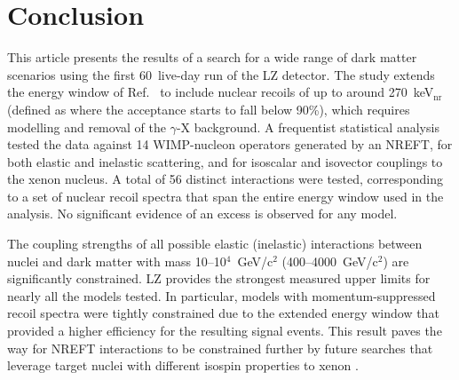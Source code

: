\documentclass[reprint, showpacs,
preprintnumbers,
amsmath,amssymb,
aps, floatfix,
superscriptaddress,
prd, nofootinbib]{revtex4-1}
\begin{document}
\section{\label{sec:conclusion}Conclusion}
This article presents the results of a search for a wide range of dark matter scenarios using the first 60~live-day run of the LZ detector.
The study extends the energy window of Ref.~\cite{LZ:SR1WS_2022} to include nuclear recoils of up to around 270~keV$_\text{nr}$ (defined as where the acceptance starts to fall below 90\%), which requires modelling and removal of the $\gamma$-X background.
A frequentist statistical analysis tested the data against 14 WIMP-nucleon operators generated by an NREFT, for both elastic and inelastic scattering, and for isoscalar and isovector couplings to the xenon nucleus.
A total of 56 distinct interactions were tested, corresponding to a set of nuclear recoil spectra that span the entire energy window used in the analysis.
No significant evidence of an excess is observed for any model.

The coupling strengths of all possible elastic (inelastic) interactions between nuclei and dark matter with mass 10--10$^4$~GeV/c$^2$ (400--4000~GeV/c$^2$) are significantly constrained.
LZ provides the strongest measured upper limits for nearly all the models tested.
In particular, models with momentum-suppressed recoil spectra were tightly constrained due to the extended energy window that provided a higher efficiency for the resulting signal events. 
This result paves the way for NREFT interactions to be constrained further by future searches that leverage target nuclei with different isospin properties to xenon \cite{schneck2015dark}. 
\end{document}
